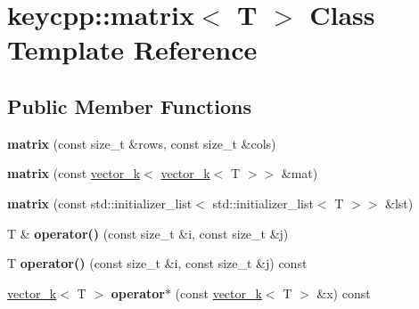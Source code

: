 \hypertarget{classkeycpp_1_1matrix}{\section{keycpp\-:\-:matrix$<$ T $>$ Class Template Reference}
\label{classkeycpp_1_1matrix}
}
\subsection*{Public Member Functions}
\begin{DoxyCompactItemize}
\item 
\hypertarget{classkeycpp_1_1matrix_af9abe487935979b178a5ba19bbc2407d}{{\bfseries matrix} (const size\-\_\-t \&rows, const size\-\_\-t \&cols)}\label{classkeycpp_1_1matrix_af9abe487935979b178a5ba19bbc2407d}

\item 
\hypertarget{classkeycpp_1_1matrix_a0a591c69e753fe21b73031192d8b7209}{{\bfseries matrix} (const \hyperlink{classkeycpp_1_1vector__k}{vector\-\_\-k}$<$ \hyperlink{classkeycpp_1_1vector__k}{vector\-\_\-k}$<$ T $>$$>$ \&mat)}\label{classkeycpp_1_1matrix_a0a591c69e753fe21b73031192d8b7209}

\item 
\hypertarget{classkeycpp_1_1matrix_ad8797411bc30cc0d42e0e9b8bcc899d7}{{\bfseries matrix} (const std\-::initializer\-\_\-list$<$ std\-::initializer\-\_\-list$<$ T $>$$>$ \&lst)}\label{classkeycpp_1_1matrix_ad8797411bc30cc0d42e0e9b8bcc899d7}

\item 
\hypertarget{classkeycpp_1_1matrix_a1d6aee76640bf28088de06c41d2ed0cb}{T \& {\bfseries operator()} (const size\-\_\-t \&i, const size\-\_\-t \&j)}\label{classkeycpp_1_1matrix_a1d6aee76640bf28088de06c41d2ed0cb}

\item 
\hypertarget{classkeycpp_1_1matrix_aad7f8337116fdca0bb494fb1b5e2e8bc}{T {\bfseries operator()} (const size\-\_\-t \&i, const size\-\_\-t \&j) const }\label{classkeycpp_1_1matrix_aad7f8337116fdca0bb494fb1b5e2e8bc}

\item 
\hypertarget{classkeycpp_1_1matrix_a02963edbfa5435269e367e12fb2cdd59}{\hyperlink{classkeycpp_1_1vector__k}{vector\-\_\-k}$<$ T $>$ {\bfseries operator$\ast$} (const \hyperlink{classkeycpp_1_1vector__k}{vector\-\_\-k}$<$ T $>$ \&x) const }\label{classkeycpp_1_1matrix_a02963edbfa5435269e367e12fb2cdd59}


\end{DoxyCompactItemize}
